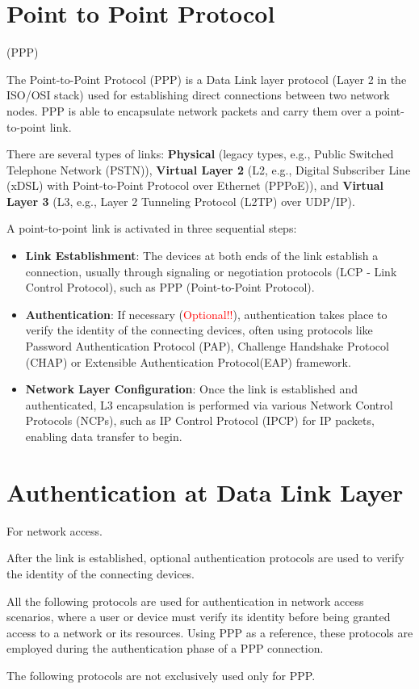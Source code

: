 \clearpage
\section{Point to Point Protocol}
\raggedright
    \begin{center}
        (PPP)
    \end{center}
The Point-to-Point Protocol (PPP) is a Data Link layer protocol (Layer 2 in the ISO/OSI stack) used for establishing direct connections between two network nodes. PPP is able to encapsulate network packets and carry them over a point-to-point link.

There are several types of links: \textbf{Physical} (legacy types, e.g., Public Switched Telephone Network (PSTN)), \textbf{Virtual Layer 2} (L2, e.g., Digital Subscriber Line (xDSL) with Point-to-Point Protocol over Ethernet (PPPoE)), and \textbf{Virtual Layer 3} (L3, e.g., Layer 2 Tunneling Protocol (L2TP) over UDP/IP).

A point-to-point link is activated in three sequential steps:
\begin{itemize}
    \item \textbf{Link Establishment}: The devices at both ends of the link establish a connection, usually through signaling or negotiation protocols (LCP - Link Control Protocol), such as PPP (Point-to-Point Protocol).
    \item \textbf{Authentication}: If necessary (\textcolor{red}{Optional!!}), authentication takes place to verify the identity of the connecting devices, often using protocols like Password Authentication Protocol (PAP), Challenge Handshake Protocol (CHAP) or Extensible Authentication Protocol(EAP) framework.
    \item \textbf{Network Layer Configuration}: Once the link is established and authenticated, L3 encapsulation is performed via various Network Control Protocols (NCPs), such as IP Control Protocol (IPCP) for IP packets, enabling data transfer to begin.
\end{itemize}

\section{Authentication at Data Link Layer}
\begin{center}
    For network access.

    After the link is established, optional authentication protocols are used to verify the identity of the connecting devices.
\end{center}
All the following protocols are used for authentication in network access scenarios, where a user or device must verify its identity before being granted access to a network or its resources. Using PPP as a reference, these protocols are employed during the authentication phase of a PPP connection.
\begin{tcolorbox}[colback=red!10!white, colframe=red!70!black, coltitle=white, title=Be aware]
    The following protocols are not exclusively used only for PPP.
\end{tcolorbox}

